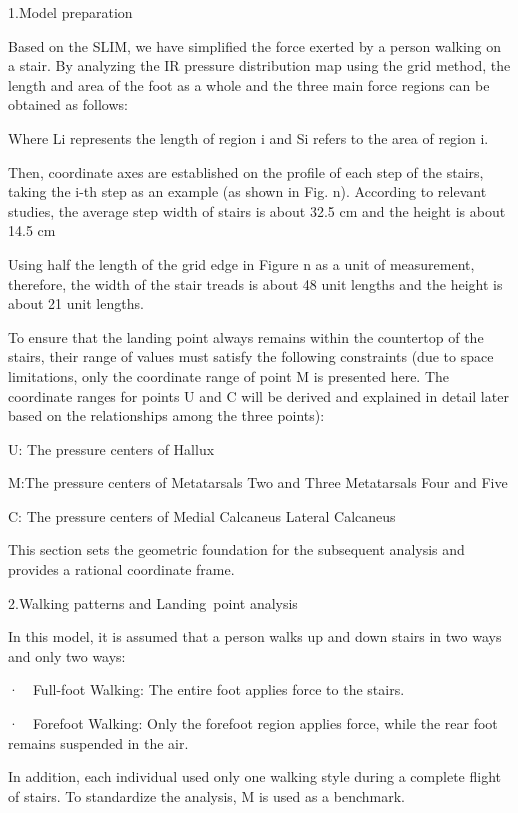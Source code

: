 \documentclass{mcmthesis}
\begin{document}
1.Model preparation

Based on the SLIM, we have simplified the force exerted by a person walking on a stair. By analyzing the IR pressure distribution map using the grid method, the length and area of the foot as a whole and the three main force regions can be obtained as follows:




Where Li represents the length of region i and Si refers to the area of region i.

Then, coordinate axes are established on the profile of each step of the stairs, taking the i-th step as an example (as shown in Fig. n). According to relevant studies, the average step width of stairs is about 32.5 cm and the height is about 14.5 cm \cite{WOS:000783553300001}

Using half the length of the grid edge in Figure n as a unit of measurement, therefore, the width of the stair treads is about 48 unit lengths and the height is about 21 unit lengths.

To ensure that the landing point always remains within the countertop of the stairs, their range of values must satisfy the following constraints (due to space limitations, only the coordinate range of point M is presented here. The coordinate ranges for points U and C will be derived and explained in detail later based on the relationships among the three points):


U: The pressure centers of Hallux  

M:The pressure centers of Metatarsals Two and Three Metatarsals Four and Five

C: The pressure centers of Medial Calcaneus Lateral Calcaneus 

This section sets the geometric foundation for the subsequent analysis and provides a rational coordinate frame.


2.Walking patterns and Landing point analysis

In this model, it is assumed that a person walks up and down stairs in two ways and only two ways:


·  Full-foot Walking: The entire foot applies force to the stairs.

·  Forefoot Walking: Only the forefoot region applies force, while the rear foot remains suspended in the air.


In addition, each individual used only one walking style during a complete flight of stairs. To standardize the analysis, M is used as a benchmark.
\end{document}
